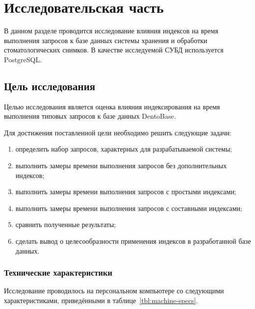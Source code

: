 \chapter{Исследовательская часть}

В данном разделе проводится исследование влияния индексов на время выполнения запросов к базе данных системы хранения и обработки стоматологических снимков. В качестве исследуемой СУБД используется PostgreSQL.

\section{Цель исследования}

Целью исследования является оценка влияния индексирования на время выполнения типовых запросов к базе данных DentoBase.

Для достижения поставленной цели необходимо решить следующие задачи:

\begin{enumerate}
	\item определить набор запросов, характерных для разрабатываемой системы;
	\item выполнить замеры времени выполнения запросов без дополнительных индексов;
	\item выполнить замеры времени выполнения запросов с простыми индексами;
	\item выполнить замеры времени выполнения запросов с составными индексами;
	\item сравнить полученные результаты;
	\item сделать вывод о целесообразности применения индексов в разработанной базе данных.
\end{enumerate}

\subsection{Технические характеристики}

Исследование проводилось на персональном компьютере со следующими характеристиками, приведёнными в таблице~\ref{tbl:machine-specs}.

